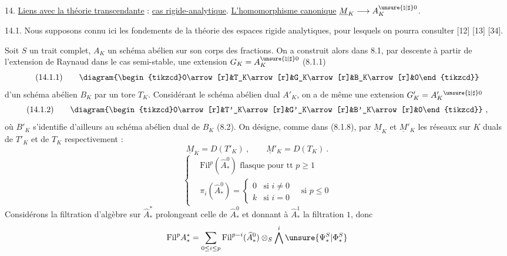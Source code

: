 14. \uline{Liens avec la théorie transcendante} : \uline{cas rigide-analytique}. \uline{L'homomorphisme canonique} $\underline M_K\longrightarrow A_K^{\unsure{\natural|\sharp}0}$.

14.1. Nous supposons connu ici les fondements de la théorie des espaces rigide analytiques, pour lesquels on pourra consulter [12] [13] [34].

Soit $S$ un trait complet, $A_K$ un schéma abélien sur son corps des fractions. On a construit alors dans 8.1, par descente à partir de l'extension de Raynaud dans le cas semi-stable, une extension $G_K=A_K^{\unsure{\natural|\sharp}0}$ (8.1.1)
\[
\text{(14.1.1)}\qquad
\diagram{\begin{tikzcd}0\arrow[r]&T_K\arrow[r]&G_K\arrow[r]&B_K\arrow[r]&0\end{tikzcd}}
\]
d'un schéma abélien $B_K$ par un tore $T_K$. Considérant le schéma abélien dual $A'_K$, on a de même une extension $G'_K=A_K'{}^{\unsure{\natural|\sharp}0}$
\[
\text{(14.1.2)}\qquad
\diagram{\begin{tikzcd}0\arrow[r]&T'_K\arrow[r]&G'_K\arrow[r]&B'_K\arrow[r]&0\end{tikzcd}}\ ,
\]
où $B'_K$ s'identifie d'ailleurs au schéma abélien dual de $B_K$ (8.2). On désigne, comme dans (8.1.8), par $\underline M_K$ et $\underline M'_K$ les réseaux sur $K$ duals de $T'_K$ et de $T_K$ respectivement :
\[
\underline M_K=D(T'_K)\ ,\qquad \underline M'_K=D(T_K)\ .\tag{14.1.3}
\]
\margin{\unsure{$*$}}
\[
\left\{\begin{aligned}
&\mathrm{Fil}^p(\widehat A_*^0)\text{ flasque pour tt }p\geq1\\
&\pi_i(\widehat A_*^0)=\begin{cases}0&\text{si }i\ne0\\k&\text{si }i=0\end{cases}\quad\text{si }p\leq0
\end{aligned}\right.
\]
Considérons la filtration d'algèbre  sur $\widehat A_*^*$ prolongeant celle de $\widehat A_*^0$ et donnant  à $\widehat A_*^1$ la filtration $1$, donc
\[
\mathrm{Fil}^p A_*^*=\sum_{0\leq i\leq p}\mathrm{Fil}^{p-i}(\widehat A_*^0)\otimes_S\bigwedge^i\unsure{\Psi_*^S|\Phi_*^S}
\]
